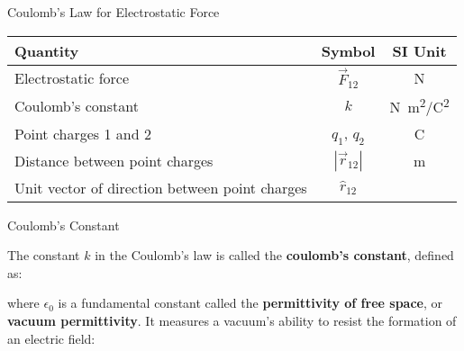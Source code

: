 \documentclass[12pt,aspectratio=169]{beamer}
\begin{document}
\begin{frame}{Coulomb's Law for Electrostatic Force}
  \begin{center}
    \begin{tabular}{l|c|c}
      \rowcolor{pink}
      \textbf{Quantity} & \textbf{Symbol} & \textbf{SI Unit} \\ \hline
      Electrostatic force    & $\vec F_{12}$ & \si\newton \\
      Coulomb's constant     & $k$          & \si{N.m^2/C^2} \\
      Point charges 1 and 2  & $q_1$, $q_2$ &  \si\coulomb \\
      Distance between point charges & $|\vec r_{12}|$ & \si\metre \\
      Unit vector of direction between point charges & $\hat r_{12}$ &
    \end{tabular}
  \end{center}




\end{frame}



\begin{frame}{Coulomb's Constant}


  The constant $k$ in the Coulomb's law is called the
  \textbf{coulomb's constant}, defined as:


  where $\epsilon_0$ is a fundamental constant called the
  \textbf{permittivity of free space}, or \textbf{vacuum permittivity}. It
  measures a vacuum's ability to resist the formation of an electric field:

\end{frame}
\end{document}
